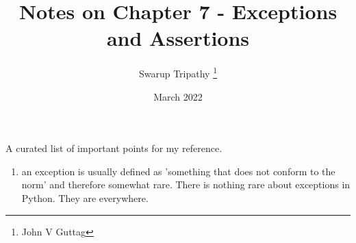 \documentclass[11pt]{article}
\title{Notes on Chapter 7 - Exceptions and Assertions}
\author{Swarup Tripathy \thanks{John V Guttag}}
\date{March 2022}
\begin{document}
    \maketitle
    A curated list of important points for my reference.\\
    \begin{enumerate}
        \item an exception is usually defined as 'something that does not conform to the norm' and therefore somewhat rare. There is nothing rare about exceptions in Python. They are everywhere.
        
    \end{enumerate}
\end{document}
